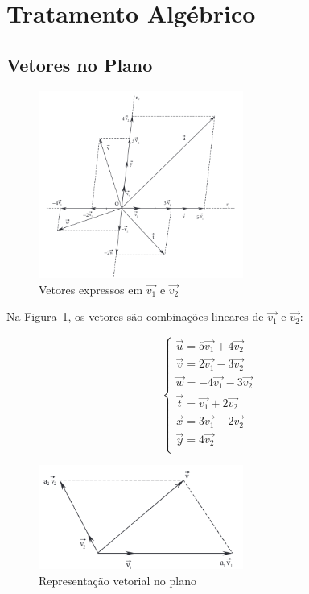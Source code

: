 \section{Tratamento Algébrico}

\subsection{Vetores no Plano}

\begin{figure}[H]
  \centering
  \includegraphics[width=0.6\textwidth]{./fig/fig1.38.png}
  \caption{Vetores expressos em $\vec{v_1}$ e $\vec{v_2}$}\label{fig:fig1.38}
\end{figure}

Na Figura~\ref{fig:fig1.38}, os vetores são combinações lineares de $\vec{v_1}$
e $\vec{v_2}$:

\[
\begin{cases}
  \vec{u} = 5\vec{v_1} + 4\vec{v_2} \\
  \vec{v} = 2\vec{v_1} - 3\vec{v_2} \\
  \vec{w} = -4\vec{v_1} - 3\vec{v_2} \\
  \vec{t} = \vec{v_1} + 2\vec{v_2} \\
  \vec{x} = 3\vec{v_1} - 2\vec{v_2} \\
  \vec{y} = 4\vec{v_2} \\
\end{cases}
\]

\begin{figure}[H]
  \centering
  \includegraphics[width=0.6\textwidth]{./fig/fig1.39.png}
  \caption{Representação vetorial no plano}\label{fig:fig1.39}
\end{figure}

